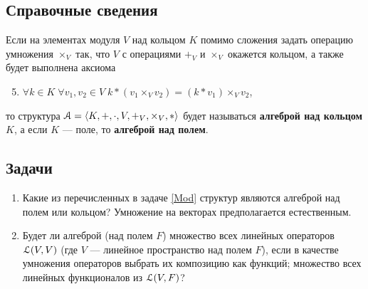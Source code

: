 \subsection*{Справочные сведения}

Если на элементах модуля $V$ над кольцом $K$ помимо сложения задать операцию умножения $\times_V$ так, что $V$ с операциями $+_V$ и $\times_V$ окажется кольцом, а также будет выполнена аксиома
\begin{enumerate}[Mod1]\setcounter{enumi}{4}
\item $\forall k\in K\;\forall v_1,v_2\in V\; k*(v_1\times_V v_2) = (k*v_1)\times_V v_2$,
\end{enumerate}
то структура $\mathcal A = \langle K,+,\cdot,V,+_V,\times_V,*\rangle$ будет называться \textbf{алгеброй над кольцом} $K$, а если $K$ --- поле, то \textbf{алгеброй над полем}.




\subsection*{Задачи}

\begin{enumerate}
\item Какие из перечисленных в задаче \ref{Mod} структур являются алгеброй над полем или кольцом? Умножение на векторах предполагается естественным.

\item Будет ли алгеброй (над полем $F$) \ipunkt множество всех линейных операторов $\mathcal L(V,V)$ (где $V$ --- линейное пространство над полем $F$), если в качестве умножения операторов выбрать их композицию как функций; \ipunkt множество всех линейных функционалов из $\mathcal L(V,F)$?




\end{enumerate}
















